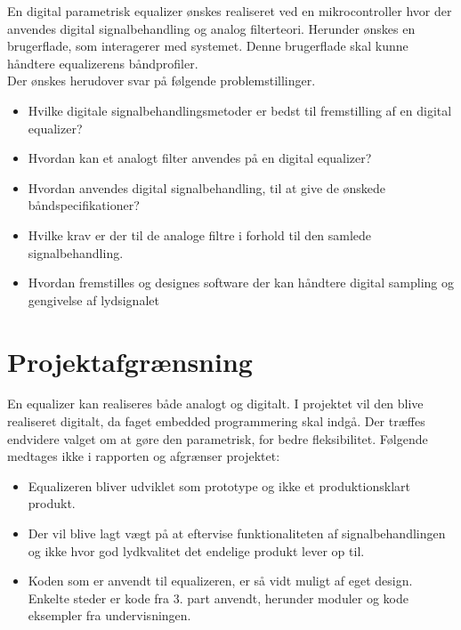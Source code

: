 En digital parametrisk equalizer ønskes realiseret ved en mikrocontroller hvor der anvendes digital signalbehandling og analog filterteori. 
Herunder ønskes en brugerflade, som interagerer med systemet. 
Denne brugerflade skal kunne håndtere equalizerens båndprofiler.\\

Der ønskes herudover svar på følgende problemstillinger.
\begin{itemize}[noitemsep]
	\item Hvilke digitale signalbehandlingsmetoder er bedst til fremstilling af en digital equalizer?
	\item Hvordan kan et analogt filter anvendes på en digital equalizer?
	\item Hvordan anvendes digital signalbehandling, til at give de ønskede båndspecifikationer?
	\item Hvilke krav er der til de analoge filtre i forhold til den samlede signalbehandling.
	\item Hvordan fremstilles og designes software der kan håndtere digital sampling og gengivelse af lydsignalet
\end{itemize}

\section{Projektafgrænsning}

En equalizer kan realiseres både analogt og digitalt.
I projektet vil den blive realiseret digitalt, da faget embedded programmering skal indgå. 
Der træffes endvidere valget om at gøre den parametrisk, for bedre fleksibilitet. 
Følgende medtages ikke i rapporten og afgrænser projektet:
\begin{itemize}[noitemsep]
	\item Equalizeren bliver udviklet som prototype og ikke et produktionsklart produkt.
	\item Der vil blive lagt vægt på at eftervise funktionaliteten af signalbehandlingen og ikke hvor god lydkvalitet det endelige produkt lever op til.
	\item Koden som er anvendt til equalizeren, er så vidt muligt af eget design. Enkelte steder er kode fra 3. part anvendt, herunder moduler og kode eksempler fra undervisningen.
\end{itemize}

